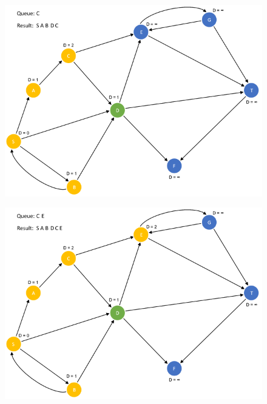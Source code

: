 \documentclass{article}
\begin{document}
\begin{figure}[H]
\centering
\includegraphics[scale=0.6]{images/Q4/08.png}
\end{figure}

\begin{figure}[H]
\centering
\includegraphics[scale=0.6]{images/Q4/09.png}
\end{figure}
\end{document}
